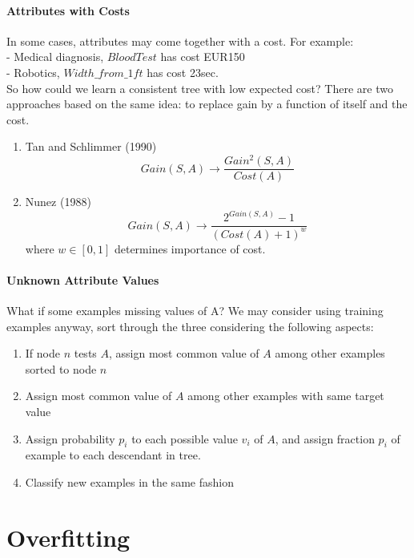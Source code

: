 \paragraph{Attributes with Costs} In some cases, attributes may come together with a cost. For example:\\
- Medical diagnosis, $BloodTest$ has cost EUR150\\
- Robotics, $Width\_from\_1ft$ has cost 23sec.\\
\linebreak
So how could we learn a consistent tree with low expected cost? There are two approaches based on the same idea: to replace gain by a function of itself and the cost.
\begin{enumerate}
    \item Tan and Schlimmer (1990)
    \begin{equation*}
        Gain(S,A) \rightarrow \frac{Gain^2 (S,A)}{Cost(A)}
    \end{equation*}
    \item Nunez (1988)
    \begin{equation*}
        Gain(S,A) \rightarrow \frac{2^{Gain (S,A)} - 1}{(Cost(A) + 1)^w}
    \end{equation*}
    where $w \in [0, 1]$ determines importance of cost.
\end{enumerate}

\paragraph{Unknown Attribute Values} What if some examples missing values of A? We may consider using training examples anyway, sort through the three considering the following aspects:
\begin{enumerate}
    \item If node $n$ tests $A$, assign most common value of $A$ among other examples sorted to node $n$
    \item Assign most common value of $A$ among other examples with same target value
    \item Assign probability $p_i$ to each possible value $v_i$ of $A$, and assign fraction $p_i$ of example to each descendant in tree.
    \item Classify new examples in the same fashion
\end{enumerate}


\section{Overfitting}

